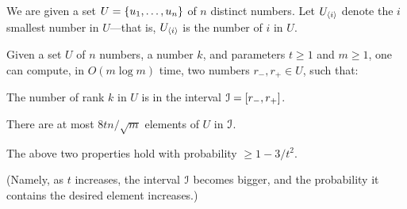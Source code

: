 



We are given a set $U = \left\{ {u_1,\ldots, u_n} \right\}$ of $n$ distinct numbers. Let
$U_{\langle i\rangle}$ denote the $i$\th smallest number in $U$---that is,
$U_{\langle i\rangle}$ is the number of  $i$ in $U$.

\begin{lemma}
    Given a set $U$ of $n$ numbers, a number $k$, and parameters
    $t \geq 1$ and $m \geq 1$, one can compute, in $O(m \log m)$ time,
    two numbers $r_{-}, r_+ \in U$, such that:
    \begin{compactenumA}
        \medskip%
        \item The number of rank $k$ in $U$ is in the interval
        $\EuScript{I} = [r_-, r_+]$.  \smallskip%
        \smallskip%
        \item There are at most $8 t {n}/ \sqrt{m}$ elements of $U$ in
        $\EuScript{I}$.
    \end{compactenumA}
    \medskip%
    The above two properties hold with probability $\geq 1-3/t^2$.

    (Namely, as $t$ increases, the interval $\EuScript{I}$ becomes
    bigger, and the probability it contains the desired element
    increases.)
\end{lemma}
